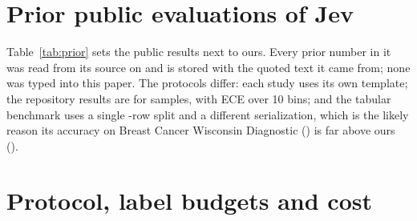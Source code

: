 \sloppy
\raggedbottom
\section{Prior public evaluations of Jev}
\label{app:prior}

Table~\ref{tab:prior} sets the public results next to ours. Every prior number in it was read from
its source on \PriorCheckedOn{} and is stored with the quoted text it came from; none was typed
into this paper. The protocols differ: each study uses its own template; the repository results
are for samples, with ECE over 10 bins; and the tabular benchmark uses a single
\PriorNStatsguysamWdbc-row split and a different serialization, which is the likely reason its
accuracy on Breast Cancer Wisconsin Diagnostic (\PriorAccStatsguysamWdbc) is far above ours
(\AccuracyJevWdbc).

\begin{table}[H]
  \caption{Prior public evaluations of zero-shot Jev on the datasets used here, next to our
    results at the default decision. Accuracy is at the argmax label.}
  \label{tab:prior}
  \centering\small
  \fittable{}
\end{table}

\section{Protocol, label budgets and cost}
\label{app:protocol}

